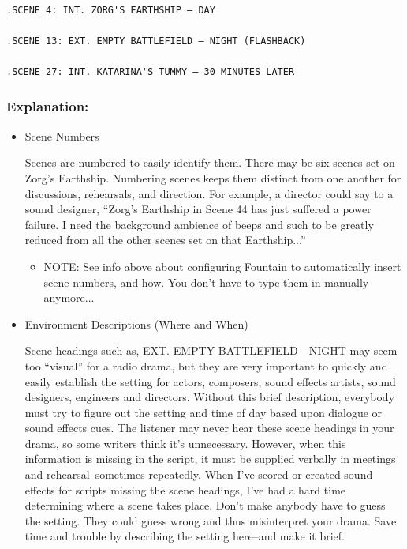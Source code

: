 \documentclass[openleft,oneside,showtrims]{memoir}
\begin{document}
\lstset{language=fountain,label= ,caption= ,captionpos=b,numbers=none}
\begin{lstlisting}

.SCENE 4: INT. ZORG'S EARTHSHIP – DAY

.SCENE 13: EXT. EMPTY BATTLEFIELD – NIGHT (FLASHBACK)

.SCENE 27: INT. KATARINA'S TUMMY – 30 MINUTES LATER

\end{lstlisting}

\subsubsection*{Explanation:}
\label{sec:org326b490}

\begin{itemize}
\item Scene Numbers
\label{sec:org092e53d}

Scenes are numbered to easily identify them. There may be six scenes set on Zorg's Earthship. Numbering scenes keeps them distinct from one another for discussions, rehearsals, and direction. For example, a director could say to a sound designer, ``Zorg's Earthship in Scene 44 has just suffered a power failure. I need the background ambience of beeps and such to be greatly reduced from all the other scenes set on that Earthship...''

\begin{itemize}
\item NOTE: See info above about configuring Fountain to automatically insert scene numbers, and how.  You don't have to type them in manually anymore...
\end{itemize}

\item Environment Descriptions (Where and When)  
\label{sec:orgc7f03c2}

Scene headings such as, EXT. EMPTY BATTLEFIELD - NIGHT may seem too ``visual'' for a radio drama, but they are very important to quickly and easily establish the setting for actors, composers, sound effects artists, sound designers, engineers and directors. Without this brief description, everybody must try to figure out the setting and time of day based upon dialogue or sound effects cues. The listener may never hear these scene headings in your drama, so some writers think it's unnecessary. However, when this information is missing in the script, it must be supplied verbally in meetings and rehearsal--sometimes repeatedly. When I've scored or created sound effects for scripts missing the scene headings, I've had a hard time determining where a scene takes place. Don't make anybody have to guess the setting. They could guess wrong and thus misinterpret your drama. Save time and trouble by describing the setting here--and make it brief.


\end{itemize}
\end{document}
